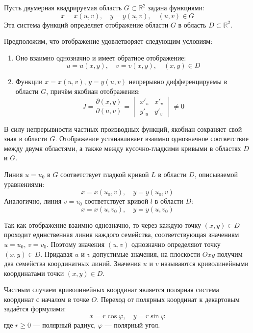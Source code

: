 \documentclass[17pt,a4paper]{extreport}
\begin{document}
Пусть двумерная квадрируемая область $G \subset \mathbb{R}^2$ задана функциями:
\[
x = x(u,v), \quad y = y(u,v), \quad (u,v) \in G
\]
Эта система функций определяет отображение области $G$ в область $D \subset \mathbb{R}^2$.

Предположим, что отображение удовлетворяет следующим условиям:
\begin{enumerate}
\item Оно взаимно однозначно и имеет обратное отображение:
  \[
  u = u(x,y), \quad v = v(x,y), \quad (x,y) \in D
  \]
\item Функции $x = x(u,v)$, $y = y(u,v)$ непрерывно дифференцируемы в области $G$, причём якобиан отображения:
  \[
  J = \frac{\partial(x,y)}{\partial(u,v)} = 
  \begin{vmatrix}
  x'_u & x'_v \\
  y'_u & y'_v
  \end{vmatrix} \neq 0
  \]
\end{enumerate}

В силу непрерывности частных производных функций, якобиан сохраняет свой знак в области $G$. Отображение устанавливает взаимно однозначное соответствие между двумя областями, а также между кусочно-гладкими кривыми в областях $D$ и $G$.

Линия $u = u_0$ в $G$ соответствует гладкой кривой $L$ в области $D$, описываемой уравнениями:
\[
x = x(u_0, v), \quad y = y(u_0, v)
\]
Аналогично, линия $v = v_0$ соответствует кривой $l$ в области $D$:
\[
x = x(u, v_0), \quad y = y(u, v_0)
\]

Так как отображение взаимно однозначно, то через каждую точку $(x,y) \in D$ проходит единственная линия каждого семейства, соответствующая значениям $u = u_0$, $v = v_0$. Поэтому значения $(u,v)$ однозначно определяют точку $(x,y) \in D$. Придавая $u$ и $v$ допустимые значения, на плоскости $Oxy$ получим два семейства координатных линий. Значения $u$ и $v$ называются криволинейными координатами точки $(x,y) \in D$.

Частным случаем криволинейных координат является полярная система координат с началом в точке $O$. Переход от полярных координат к декартовым задаётся формулами:
\[
x = r\cos\varphi, \quad y = r\sin\varphi
\]
где $r \geq 0$ --- полярный радиус, $\varphi$ --- полярный угол.
\end{document}
